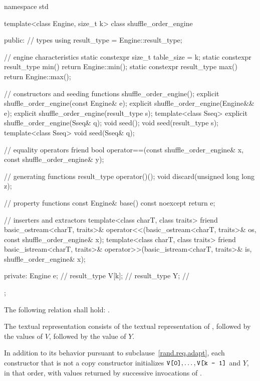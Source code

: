 %
%
\begin{codeblock}
namespace std {
  template<class Engine, size_t k>
  class shuffle_order_engine {
  public:
    // types
    using result_type = Engine::result_type;

    // engine characteristics
    static constexpr size_t table_size = k;
    static constexpr result_type min() { return Engine::min(); }
    static constexpr result_type max() { return Engine::max(); }

    // constructors and seeding functions
    shuffle_order_engine();
    explicit shuffle_order_engine(const Engine& e);
    explicit shuffle_order_engine(Engine&& e);
    explicit shuffle_order_engine(result_type s);
    template<class Sseq> explicit shuffle_order_engine(Sseq& q);
    void seed();
    void seed(result_type s);
    template<class Sseq> void seed(Sseq& q);

    // equality operators
    friend bool operator==(const shuffle_order_engine& x, const shuffle_order_engine& y);

    // generating functions
    result_type operator()();
    void discard(unsigned long long z);

    // property functions
    const Engine& base() const noexcept { return e; }

    // inserters and extractors
    template<class charT, class traits>
      friend basic_ostream<charT, traits>&
        operator<<(basic_ostream<charT, traits>& os, const shuffle_order_engine& x);
    template<class charT, class traits>
      friend basic_istream<charT, traits>&
        operator>>(basic_istream<charT, traits>& is, shuffle_order_engine& x);

  private:
    Engine e;           // \expos
    result_type V[k];   // \expos
    result_type Y;      // \expos
  };
}
\end{codeblock}

\pnum
The following relation shall hold:
  .

\pnum
The textual representation
consists of
 the textual representation of ,
followed by
 the  values of $V$,
followed by
 the value of $Y$.

\pnum
In addition to its behavior
pursuant to subclause~\ref{rand.req.adapt},
each constructor%
that is not a copy constructor
initializes $\tcode{V[0]}, \dotsc, \tcode{V[k - 1]}$ and $Y$,
in that order,
with values returned by successive invocations of .%


